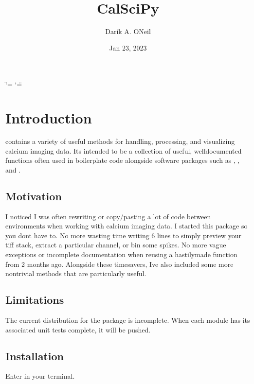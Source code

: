 \documentclass[letterpaper,10pt,english]{sphinxmanual}
\title{CalSciPy}
\date{Jan 23, 2023}
\author{Darik A.\@{} O\textquotesingle{}Neil}
\begin{document}
\ifdefined\shorthandoff
  \ifnum\catcode`\=\string=\active\shorthandoff{=}\fi
  \ifnum\catcode`\"=\active{}\fi
\fi

\pagestyle{empty}
\sphinxmaketitle
\pagestyle{plain}
\sphinxtableofcontents
\pagestyle{normal}
\label{\detokenize{index::doc}}


\sphinxstepscope


\chapter{Introduction}
\label{\detokenize{Introduction:introduction}}\label{\detokenize{Introduction::doc}}
\sphinxAtStartPar
{} contains a variety of useful methods for handling, processing, and visualizing calcium imaging data.
It\textquotesingle{}s intended to be a collection of useful, well\sphinxhyphen{}documented functions often used in boilerplate code alongside software
packages such as , ,
and .


\section{Motivation}
\label{\detokenize{Introduction:motivation}}
\sphinxAtStartPar
I noticed I was often re\sphinxhyphen{}writing or copy/pasting a lot of code between environments when working with calcium imaging
data. I started this package so you don\textquotesingle{}t have to. No more wasting time writing 6 lines to simply preview your tiff
stack, extract a particular channel, or bin some spikes. No more vague exceptions or incomplete documentation when re\sphinxhyphen{}using
a hastily\sphinxhyphen{}made function from 2 months ago. Alongside these time\sphinxhyphen{}savers, I\textquotesingle{}ve also included some more non\sphinxhyphen{}trivial methods
that are particularly useful.


\section{Limitations}
\label{\detokenize{Introduction:limitations}}
\sphinxAtStartPar
The current distribution for the package is incomplete. When each module has its associated unit tests complete, it will
be pushed.


\section{Installation}
\label{\detokenize{Introduction:installation}}
\sphinxAtStartPar
Enter  in your terminal.
\end{document}
